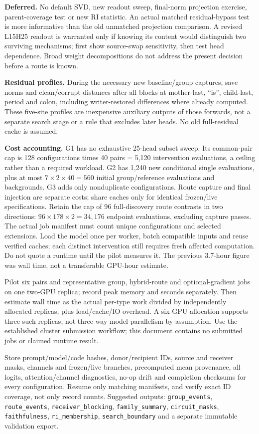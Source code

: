 \documentclass[11pt,a4paper]{article}
\newcommand{\file}[1]{\nolinkurl{#1}}
\begin{document}
\textbf{Deferred.} No default SVD, new readout sweep, final-norm projection exercise,
parent-coverage test or new RI statistic. An actual matched residual-bypass test is
more informative than the old unmatched projection comparison. A revised L15H25
readout is warranted only if knowing its content would distinguish two surviving
mechanisms; first show source-swap sensitivity, then test head dependence. Broad
weight decompositions do not address the present decision before a route is known.

\textbf{Residual profiles.} During the necessary new baseline/group captures, save
norms and clean/corrupt distances after all blocks at mother-last, ``is'', child-last,
period and colon, including writer-restored differences where already computed.
These five-site profiles are inexpensive auxiliary outputs of those forwards, not
a separate search stage or a rule that excludes later heads. No old full-residual
cache is assumed.

\textbf{Cost accounting.} G1 has no exhaustive 25-head subset sweep. Its common-pair
cap is 128 configurations times 40 pairs = 5,120 intervention evaluations, a ceiling
rather than a required workload. G2 has 1,240 new conditional single evaluations,
plus at most $7\times2\times40=560$ initial group/reference evaluations and backgrounds.
G3 adds only nonduplicate configurations. Route capture and final injection are
separate costs; share caches only for identical frozen/live specifications.
Retain the cap of 96 full-discovery route contrasts in two directions:
$96\times178\times2=34,176$ endpoint evaluations, excluding capture passes.
The actual job manifest must count unique configurations and selected extensions.
Load the model once per worker, batch compatible inputs and reuse verified caches;
each distinct intervention still requires fresh affected computation. Do not quote
a runtime until the pilot measures it. The previous 3.7-hour figure was wall time,
not a transferable GPU-hour estimate.

Pilot six pairs and representative group, hybrid-route and optional-gradient jobs
on one two-GPU replica; record peak memory and seconds separately. Then estimate
wall time as the actual per-type work divided by independently allocated replicas,
plus load/cache/IO overhead. A six-GPU allocation supports three such replicas, not
three-way model parallelism by assumption. Use the established cluster submission
workflow; this document contains no submitted jobs or claimed runtime result.

Store prompt/model/code hashes, donor/recipient IDs, source and receiver masks,
channels and frozen/live branches, precomputed mean provenance, all logits,
attention/channel diagnostics, no-op drift and completion checksums for every
configuration. Resume only matching manifests, and verify exact ID coverage, not
only record counts. Suggested outputs: \file{group_events},
\file{route_events}, \file{receiver_blocking}, \file{family_summary},
\file{circuit_masks}, \file{faithfulness}, \file{ri_membership},
\file{search_boundary} and a separate immutable validation export.
\end{document}
